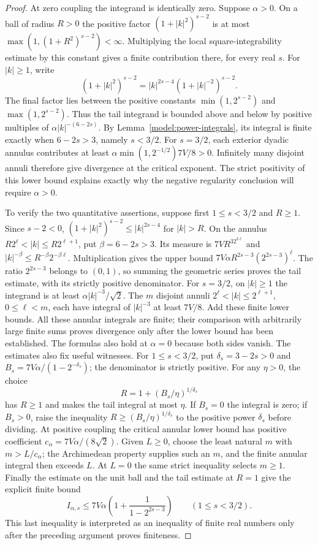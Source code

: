 \documentclass[11pt,a4paper]{article}
\theoremstyle{definition}
\theoremstyle{remark}
\begin{document}
\begin{proof}
At zero coupling the integrand is identically zero. Suppose
$\alpha>0$. On a ball of radius $R>0$ the positive factor
$(1+|k|^2)^{s-2}$ is at most
$\max(1,(1+R^2)^{s-2})<\infty$. Multiplying the local
square-integrability estimate by this constant gives a finite
contribution there, for every real $s$. For $|k|\geq1$, write
\[
 (1+|k|^2)^{s-2}=|k|^{2s-4}(1+|k|^{-2})^{s-2}.
\]
The final factor lies between the positive constants
$\min(1,2^{s-2})$ and $\max(1,2^{s-2})$. Thus the tail integrand
is bounded above and below by positive multiples of
$\alpha|k|^{-(6-2s)}$. By Lemma~\ref{model:power-integrals}, its
integral is finite exactly when $6-2s>3$, namely $s<3/2$.
For $s=3/2$, each exterior dyadic annulus contributes at least
$\alpha\min(1,2^{-1/2})7V/8>0$. Infinitely many disjoint annuli
therefore give divergence at the critical exponent. The strict
positivity of this lower bound explains exactly why the negative
regularity conclusion will require $\alpha>0$.

To verify the two quantitative assertions, suppose first
$1\leq s<3/2$ and $R\geq1$. Since $s-2<0$,
$(1+|k|^2)^{s-2}\leq|k|^{2s-4}$ for $|k|>R$.
On the annulus $R2^\ell<|k|\leq R2^{\ell+1}$, put
$\beta=6-2s>3$. Its measure is $7VR^32^{3\ell}$ and
$|k|^{-\beta}\leq R^{-\beta}2^{-\beta\ell}$.
Multiplication gives the upper bound
$7V\alpha R^{2s-3}(2^{2s-3})^\ell$. The ratio
$2^{2s-3}$ belongs to $(0,1)$, so summing the geometric series
proves the tail estimate, with its strictly positive denominator.
For $s=3/2$, on $|k|\geq1$ the integrand is at least
$\alpha|k|^{-3}/\sqrt2$. The $m$ disjoint annuli
$2^\ell<|k|\leq2^{\ell+1}$, $0\leq\ell<m$, each
have integral of $|k|^{-3}$ at least $7V/8$. Add these
finite lower bounds. All these annular integrals are finite;
their comparison with arbitrarily large finite sums proves
divergence only after the lower bound has been established.
The formulas also hold at $\alpha=0$ because both sides vanish.
The estimates also fix useful witnesses. For $1\leq s<3/2$, put
$\delta_s=3-2s>0$ and $B_s=7V\alpha/(1-2^{-\delta_s})$;
the denominator is strictly positive. For any $\eta>0$, the choice
\[
 R=1+(B_s/\eta)^{1/\delta_s}
\]
has $R\geq1$ and makes the tail integral at most $\eta$.
If $B_s=0$ the integral is zero; if $B_s>0$, raise the
inequality $R\geq(B_s/\eta)^{1/\delta_s}$ to the positive
power $\delta_s$ before dividing. At positive coupling the
critical annular lower bound has positive coefficient
$c_\alpha=7V\alpha/(8\sqrt2)$. Given $L\geq0$, choose the
least natural $m$ with $m>L/c_\alpha$; the Archimedean property
supplies such an $m$, and the finite annular integral then exceeds
$L$. At $L=0$ the same strict inequality selects $m\geq1$.
Finally the estimate on the unit ball and the tail estimate at
$R=1$ give the explicit finite bound
\[
 I_{\alpha,s}\leq
 7V\alpha\left(1+\frac1{1-2^{2s-3}}\right)
       \qquad(1\leq s<3/2).
\]
This last inequality is interpreted as an inequality of finite real
numbers only after the preceding argument proves finiteness.
\end{proof}
\end{document}
